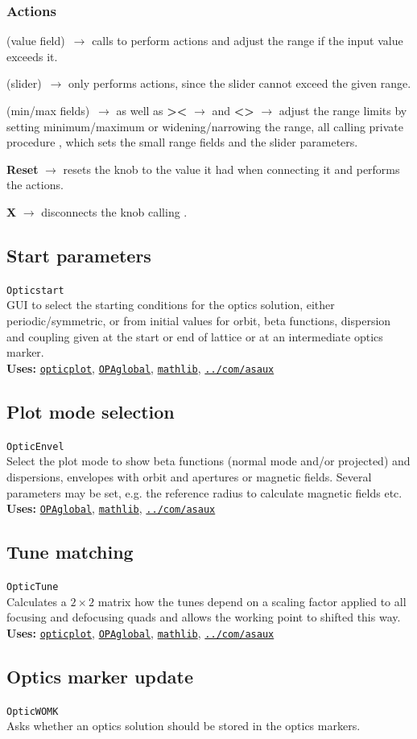 \documentclass[12pt]{article}
\newcommand\code[1]{{\tt #1}}
\newcommand{\ofld}[1]{\colorbox{black!15}{{\bf #1}}}
\newcommand{\ofldx}[1]{\colorbox{black!15}{(#1)}}
\newcommand\guifco[1]{{\color{violet}\code{#1}}}
\newcommand{\evcodf}[2]{\ofld{#1} $\rightarrow$ \guifco{#2}}
\newcommand{\evcodxf}[2]{\ofldx{#1}~$\rightarrow$ \guifco{#2}}
\newcommand{\opagui}[1]{\colorbox{blue!20}{\code{#1}}}
\newcommand{\oguih}[2]{\subsection{\label{#2}#1}{\Huge\opagui{#2}}\\}
\newcommand{\opauni}[1]{\colorbox{orange!30}{\code{#1}}}
\newcommand{\ouni}[1]{\hyperref[#1]{\opauni{#1}}}
\newcommand{\uses}[1]{{\bf Uses: } #1}
\newcommand{\act}[1]{\subsubsection*{Actions} #1}
\begin{document}
\act{
\evcodxf{value field}{editKKeyPress} calls \guifco{KUpdate} to perform actions and adjust the range if the input value exceeds it.

\evcodxf{slider}{sliderScroll} only performs actions, since the slider cannot exceed the given range.

\evcodxf{min/max fields}{editmin/maxKeyPress} as well as \evcodf{\textgreater\textless}{butwidClick} and \evcodf{\textless\textgreater}{butnarClick} adjust the range limits by setting minimum/maximum or widening/narrowing the range, all calling private procedure \guifco{SetKrange}, which sets the small range fields and the slider parameters.

\evcodf{Reset}{butresClick} resets the knob to the value it had when connecting it and performs the actions.

\evcodf{X}{butfreeClick} disconnects the knob calling \guifco{Unload}.
}

\oguih{Start parameters}{Opticstart} 

GUI to select the starting conditions for the optics solution, either periodic/symmetric, or from initial values for orbit, beta functions, dispersion and coupling given at the start or end of lattice or at an intermediate optics marker.\\


\uses{\ouni{opticplot}, \ouni{OPAglobal}, \ouni{mathlib}, \ouni{../com/asaux}} 

\oguih{Plot mode selection}{OpticEnvel} 

Select the plot mode to show beta functions (normal mode and/or projected) and dispersions, envelopes with orbit and apertures or magnetic fields. Several parameters may be set, e.g. the reference radius to calculate magnetic fields etc.\\


\uses{\ouni{OPAglobal}, \ouni{mathlib}, \ouni{../com/asaux}} 


\oguih{Tune matching}{OpticTune} 

Calculates a $2\times 2$ matrix how the tunes depend on a scaling factor applied to all focusing and defocusing quads and allows the working point to shifted this way.\\

\uses{\ouni{opticplot}, \ouni{OPAglobal}, \ouni{mathlib}, \ouni{../com/asaux}} 


\oguih{Optics marker update}{OpticWOMK} 
Asks whether an optics solution should be stored in the optics markers.\\
\end{document}
